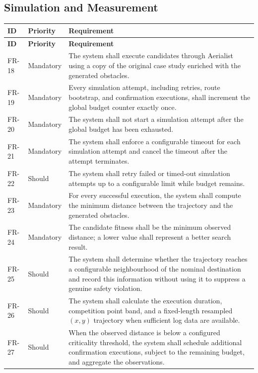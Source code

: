 \documentclass[11pt,a4paper,openany]{report}
\begin{document}
\subsection{Simulation and Measurement}
\begin{longtable}{L{1.7cm} L{2.1cm} L{10.8cm}}
\toprule
\textbf{ID} & \textbf{Priority} & \textbf{Requirement}\\
\midrule
\endfirsthead
\toprule
\textbf{ID} & \textbf{Priority} & \textbf{Requirement}\\
\midrule
\endhead
FR-18 & Mandatory & The system shall execute candidates through Aerialist using a copy of the original case study enriched with the generated obstacles.\\
FR-19 & Mandatory & Every simulation attempt, including retries, route bootstrap, and confirmation executions, shall increment the global budget counter exactly once.\\
FR-20 & Mandatory & The system shall not start a simulation attempt after the global budget has been exhausted.\\
FR-21 & Mandatory & The system shall enforce a configurable timeout for each simulation attempt and cancel the timeout after the attempt terminates.\\
FR-22 & Should & The system shall retry failed or timed-out simulation attempts up to a configurable limit while budget remains.\\
FR-23 & Mandatory & For every successful execution, the system shall compute the minimum distance between the trajectory and the generated obstacles.\\
FR-24 & Mandatory & The candidate fitness shall be the minimum observed distance; a lower value shall represent a better search result.\\
FR-25 & Should & The system shall determine whether the trajectory reaches a configurable neighbourhood of the nominal destination and record this information without using it to suppress a genuine safety violation.\\
FR-26 & Should & The system shall calculate the execution duration, competition point band, and a fixed-length resampled $(x,y)$ trajectory when sufficient log data are available.\\
FR-27 & Should & When the observed distance is below a configured criticality threshold, the system shall schedule additional confirmation executions, subject to the remaining budget, and aggregate the observations.\\
\bottomrule
\end{longtable}
\end{document}
